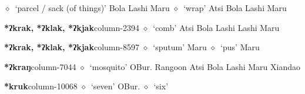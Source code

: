          $\diamond$~`parcel / sack (of things)'
         Bola 
\hspace{1ex}
         Lashi 
\hspace{1ex}
         Maru 
\hspace{1ex}
         $\diamond$~`wrap'
         Atsi 
\hspace{1ex}
         Bola 
\hspace{1ex}
         Lashi 
\hspace{1ex}
         Maru 
  \item {\footnotesize \textbf{*ʔkrak, *ʔklak, *ʔkjak}}{\tiny column-2394}
         $\diamond$~`comb'
         Atsi 
\hspace{1ex}
         Bola 
\hspace{1ex}
         Lashi 
\hspace{1ex}
         Lashi 
\hspace{1ex}
         Maru 
  \item {\footnotesize \textbf{*ʔkrak, *ʔklak, *ʔkjak}}{\tiny column-8597}
         $\diamond$~`sputum'
         Maru 
\hspace{1ex}
         $\diamond$~`pus'
         Maru 
  \item {\footnotesize \textbf{*ʔkraŋ}}{\tiny column-7044}
         $\diamond$~`mosquito'
         OBur. 
\hspace{1ex}
         Rangoon 
\hspace{1ex}
         Atsi 
\hspace{1ex}
         Bola 
\hspace{1ex}
         Lashi 
\hspace{1ex}
         Maru 
\hspace{1ex}
         Xiandao 
  \item {\footnotesize \textbf{*kruk}}{\tiny column-10068}
         $\diamond$~`seven'
         OBur. 
\hspace{1ex}
         $\diamond$~`six'
